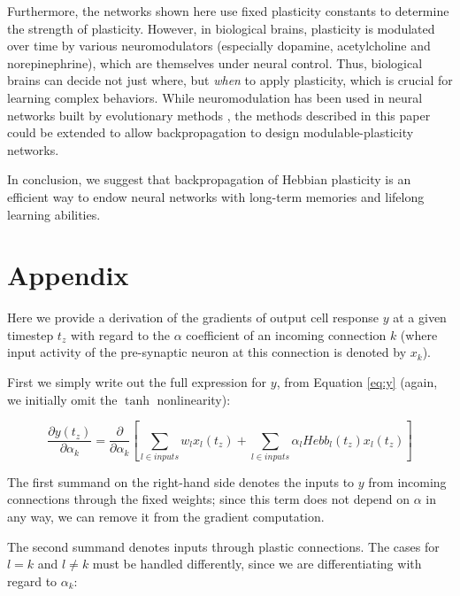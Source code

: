 \documentclass{article}
\begin{document}
Furthermore, the networks shown here use fixed plasticity constants to determine
the strength of plasticity. However, in biological brains, plasticity is
modulated over time by various neuromodulators (especially dopamine,
acetylcholine and norepinephrine), which are themselves under neural control.
Thus, biological brains can decide not just where, but \emph{when} to apply
plasticity, which is crucial for learning complex behaviors. While
neuromodulation has been used in neural networks built by evolutionary methods
\cite{Soltoggio2013-rg}, the methods described in this paper could be extended to allow
backpropagation to design modulable-plasticity networks.


In conclusion, we suggest that backpropagation of Hebbian plasticity is an
efficient way to endow neural networks with long-term memories and lifelong
learning abilities. 

\section*{Appendix}

Here we provide a derivation of the gradients of output cell
response $y$ at a given timestep $t_z$ with regard to the $\alpha$ coefficient
of an incoming connection $k$ (where input activity of the pre-synaptic neuron
at this connection is denoted by $x_k$). 

First we simply write out the
full expression for $y$, from Equation \ref{eq:y} (again, we initially omit
the $\tanh$ nonlinearity):

\[
\frac{\partial y(t_z)}{\partial \alpha_k} = \frac{\partial }{\partial \alpha_k}[ \sum_{l \in inputs}w_l x_l(t_z) + \sum_{l \in inputs}\alpha_l Hebb_l(t_z) x_l(t_z) ] 
\]

The first summand on the right-hand side denotes the inputs to $y$ from incoming connections through the fixed weights; since this term does not depend on $\alpha$ in any way, we can remove it from the gradient computation.

The second summand denotes inputs through plastic connections. The cases for
$l=k$ and $l\neq k$ must be handled differently, since we are differentiating
with regard to $\alpha_k$:
\end{document}
